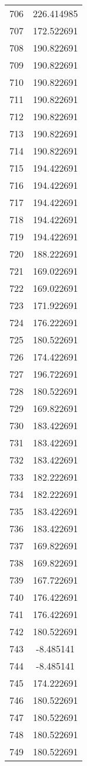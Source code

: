 \documentclass[12pt]{article}
\begin{document}
\begin{longtable}{@{}cc@{}}
706 & 226.414985 \\
707 & 172.522691 \\
708 & 190.822691 \\
709 & 190.822691 \\
710 & 190.822691 \\
711 & 190.822691 \\
712 & 190.822691 \\
713 & 190.822691 \\
714 & 190.822691 \\
715 & 194.422691 \\
716 & 194.422691 \\
717 & 194.422691 \\
718 & 194.422691 \\
719 & 194.422691 \\
720 & 188.222691 \\
721 & 169.022691 \\
722 & 169.022691 \\
723 & 171.922691 \\
724 & 176.222691 \\
725 & 180.522691 \\
726 & 174.422691 \\
727 & 196.722691 \\
728 & 180.522691 \\
729 & 169.822691 \\
730 & 183.422691 \\
731 & 183.422691 \\
732 & 183.422691 \\
733 & 182.222691 \\
734 & 182.222691 \\
735 & 183.422691 \\
736 & 183.422691 \\
737 & 169.822691 \\
738 & 169.822691 \\
739 & 167.722691 \\
740 & 176.422691 \\
741 & 176.422691 \\
742 & 180.522691 \\
743 & -8.485141 \\
744 & -8.485141 \\
745 & 174.222691 \\
746 & 180.522691 \\
747 & 180.522691 \\
748 & 180.522691 \\
749 & 180.522691 \\

\end{longtable}
\end{document}
